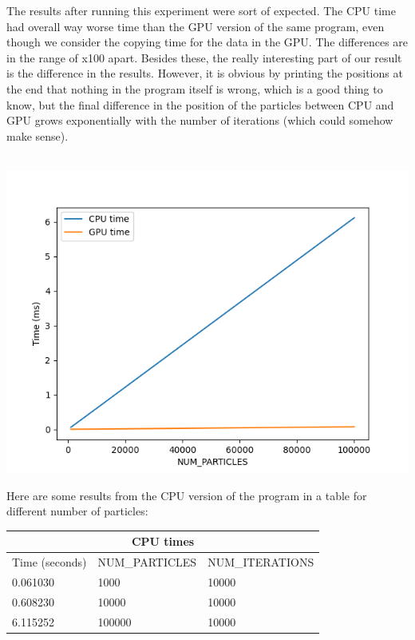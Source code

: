 \documentclass[english]{exam}
\begin{document}
{The results after running this experiment were sort of expected. The CPU time had overall way worse time than the GPU version of the same program, even though we consider the copying time for the data in the GPU. The differences are in the range of x100 apart. Besides these, the really interesting part of our result is the difference in the results. However, it is obvious by printing the positions at the end that nothing in the program itself is wrong, which is a good thing to know, but the final difference in the position of the particles between CPU and GPU grows exponentially with the number of iterations (which could somehow make sense).
\\\\
  \begin{center}
    \includegraphics[scale=0.6]{plot4.png}
  \end{center}
\noindent
Here are some results from the CPU version of the program in a table for different number of particles:
\\
\begin{center}
  \begin{tabular}{ |p{4cm}||p{4cm}|p{4cm}|  }
    \hline
    \multicolumn{3}{|c|}{CPU times} \\
    \hline
    Time (seconds)& NUM\_PARTICLES& NUM\_ITERATIONS\\
    \hline
    0.061030& 1000& 10000\\
    0.608230& 10000& 10000\\
    6.115252& 100000& 10000\\
    \hline
  \end{tabular}
\end{center}

}
\end{document}

